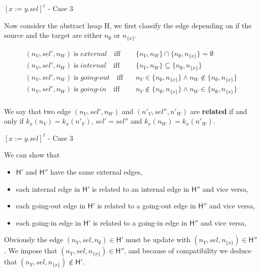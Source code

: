 \documentclass[xcolor=svgnames,11pt]{beamer}
\begin{document}
\begin{frame}{$[x:=y.sel]^\ell$ - Case 3}

Now consider the abstract heap H, we first classify the edge depending on if the source and the target are either $n_\emptyset$ or $n_{\{x\}}$.

\pause

\begin{footnotesize}

\begin{align*}
(n_V, sel', n_W)\; \mathrm{is}\; external \quad\mathrm{iff}&\quad \{n_V, n_W\} \cap \{n_\emptyset, n_{\{x\}}\} = \emptyset \\
(n_V, sel', n_W)\; \mathrm{is}\; internal \quad\mathrm{iff}&\quad \{n_V, n_W\} \subseteq \{n_\emptyset, n_{\{x\}}\} \\
(n_V, sel', n_W)\; \mathrm{is}\; going\text{-}out \quad\mathrm{iff}&\quad n_V \in \{n_\emptyset, n_{\{x\}} \} \wedge n_W \not\in \{n_\emptyset, n_{\{x\}} \} \\
(n_V, sel', n_W)\; \mathrm{is}\; going\text{-}in \quad\mathrm{iff}&\quad n_V \not\in \{n_\emptyset, n_{\{x\}}\} \wedge n_W \in \{n_\emptyset, n_{\{x\}} \} \\
\end{align*}

\pause

We say that two edge $(n_V, sel', n_W)$ and $(n'_V, sel'', n'_W)$ are \textbf{related} if and only if $k_x(n_V) = k_x(n'_V)$, $sel' = sel''$ and $k_x(n_W) = k_x(n'_W)$.

\end{footnotesize}
\end{frame}

\begin{frame}{$[x:=y.sel]^\ell$ - Case 3}

We can show that
\begin{itemize}
\item $\mathsf{H'}$ and $\mathsf{H''}$ have the same external edges,
\pause
\medskip
\item each internal edge in $\mathsf{H'}$ is related to an internal edge in $\mathsf{H''}$ and vice versa,
\pause
\medskip
\item each going-out edge in $\mathsf{H'}$ is related to a going-out edge in $\mathsf{H''}$ and vice versa,
\pause
\medskip
\item each going-in edge in $\mathsf{H'}$ is related to a going-in edge in $\mathsf{H''}$ and vice versa,
\end{itemize}
\pause
Obviously the edge $(n_Y, sel, n_\emptyset) \in \mathsf{H'}$ must be update with $(n_Y, sel, n_{\{x\}}) \in \mathsf{H''}$. We impose that $(n_Y, sel, n_{\{x\}}) \in \mathsf{H''}$, and because of compatibility we deduce that $(n_Y, sel, n_{\{x\}}) \not\in \mathsf{H'}$.
\end{frame}
\end{document}
